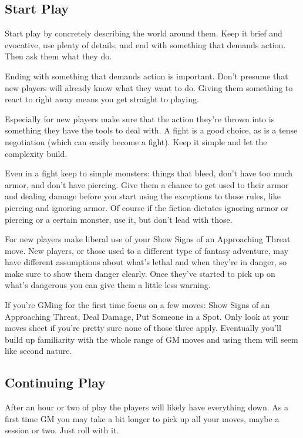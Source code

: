 \subsection{Start Play}


Start play by concretely describing the world around them. Keep it brief and evocative, use plenty of details, and end with something that demands action. Then ask them what they do.


Ending with something that demands action is important. Don't presume that new players will already know what they want to do. Giving them something to react to right away means you get straight to playing.


Especially for new players make sure that the action they're thrown into is something they have the tools to deal with. A fight is a good choice, as is a tense negotiation (which can easily become a fight). Keep it simple and let the complexity build.


Even in a fight keep to simple monsters: things that bleed, don't have too much armor, and don't have piercing. Give them a chance to get used to their armor and dealing damage before you start using the exceptions to those rules, like piercing and ignoring armor. Of course if the fiction dictates ignoring armor or piercing or a certain monster, use it, but don't lead with those.


For new players make liberal use of your Show Signs of an Approaching Threat move. New players, or those used to a different type of fantasy adventure, may have different assumptions about what's lethal and when they're in danger, so make sure to show them danger clearly. Once they've started to pick up on what's dangerous you can give them a little less warning.


If you're GMing for the first time focus on a few moves: Show Signs of an Approaching Threat, Deal Damage, Put Someone in a Spot. Only look at your moves sheet if you're pretty sure none of those three apply. Eventually you'll build up familiarity with the whole range of GM moves and using them will seem like second nature.
\subsection{Continuing Play}


After an hour or two of play the players will likely have everything down. As a first time GM you may take a bit longer to pick up all your moves, maybe a session or two. Just roll with it.


